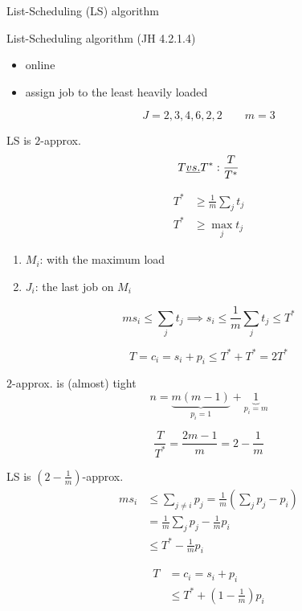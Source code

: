 \begin{frame}{List-Scheduling (LS) algorithm}
  \begin{exampleblock}{List-Scheduling algorithm (JH 4.2.1.4)}
	\begin{itemize}
	  \item online
	  \item assign job to the least heavily loaded
	\end{itemize}
  \end{exampleblock}

  \[
	J = {2,3,4,6,2,2} \qquad m = 3
  \]
\end{frame}
\begin{frame}{LS is $2$-approx.}
  \[
	T \emph{ vs. } T^{\ast}: \frac{T}{T^{\ast}}
  \]

  \begin{align*}
	T^{\ast} &\ge \frac{1}{m} \sum_{j} t_j \\
	T^{\ast} &\ge \max_{j} t_j
  \end{align*}

  \begin{enumerate}
	\item $M_i$: with the maximum load
	\item $J_i$: the last job on $M_i$
  \end{enumerate}

  \[
	ms_i \le \sum_{j} t_j \implies s_i \le \frac{1}{m} \sum_{j} t_j \le T^{\ast}
  \]

  \[
	T = c_i = s_i + p_i \le T^{\ast} + T^{\ast} = 2T^{\ast}
  \]
\end{frame}
\begin{frame}{$2$-approx. is (almost) tight}
  \[
	n = \underbrace{m(m - 1)}_{p_i = 1} + \underbrace{1}_{p_i = m}
  \]

  \[
	\frac{T}{T^{\ast}} = \frac{2m - 1}{m} = 2 - \frac{1}{m}
  \]
\end{frame}
\begin{frame}{LS is $(2-\frac{1}{m})$-approx.}
  \begin{align*}
	m s_i &\le \sum_{j \neq i} p_j = \frac{1}{m} (\sum_{j} p_j - p_i) \\
	&= \frac{1}{m} \sum_{j} p_j - \frac{1}{m} p_i \\
	&\le T^{\ast} - \frac{1}{m} p_i
  \end{align*}

  \begin{align*}
	T &= c_i = s_i + p_i \\
	&\le T^{\ast} + (1 - \frac{1}{m}) p_i
  \end{align*}
\end{frame}
